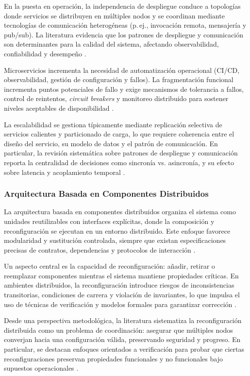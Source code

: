 			En la puesta en operación, la independencia de despliegue conduce a topologías donde servicios se distribuyen en múltiples nodos y se coordinan mediante tecnologías de comunicación heterogéneas (p.\,ej., invocación remota, mensajería y pub/sub). La literatura evidencia que los patrones de despliegue y comunicación son determinantes para la calidad del sistema, afectando observabilidad, confiabilidad y desempeño \cite{Aksakalli2021Deployment}.
			
			Microservicios incrementa la necesidad de automatización operacional (CI/CD, observabilidad, gestión de configuración y fallos). La fragmentación funcional incrementa puntos potenciales de fallo y exige mecanismos de tolerancia a fallos, control de reintentos, \textit{circuit breakers} y monitoreo distribuido para sostener niveles aceptables de disponibilidad \cite{Aksakalli2021Deployment}.
			
			La escalabilidad se gestiona típicamente mediante replicación selectiva de servicios calientes y particionado de carga, lo que requiere coherencia entre el diseño del servicio, su modelo de datos y el patrón de comunicación. En particular, la revisión sistemática sobre patrones de despliegue y comunicación reporta la centralidad de decisiones como sincronía vs. asincronía, y su efecto sobre latencia y acoplamiento temporal \cite{Aksakalli2021Deployment}.
			
		\subsubsection{Arquitectura Basada en Componentes Distribuidos}
			\noindent
			La arquitectura basada en componentes distribuidos organiza el sistema como unidades reutilizables con interfaces explícitas, donde la composición y reconfiguración se ejecutan en un entorno distribuido. Este enfoque favorece modularidad y sustitución controlada, siempre que existan especificaciones precisas de contratos, dependencias y protocolos de interacción \cite{CoullonEtAl2023CSUR}.
			
			Un aspecto central es la capacidad de reconfiguración: añadir, retirar o reemplazar componentes mientras el sistema mantiene propiedades críticas. En ambientes distribuidos, la reconfiguración introduce riesgos de inconsistencias transitorias, condiciones de carrera y violación de invariantes, lo que impulsa el uso de técnicas de verificación y modelos formales para garantizar corrección \cite{CoullonEtAl2023CSUR}.
			
			Desde una perspectiva metodológica, la literatura sistematiza la reconfiguración distribuida como un problema de coordinación: asegurar que múltiples nodos converjan hacia una configuración válida, preservando seguridad y progreso. En particular, se destacan enfoques orientados a verificación para probar que ciertas reconfiguraciones preservan propiedades funcionales y no funcionales bajo supuestos operacionales \cite{CoullonEtAl2023CSUR}.
			
